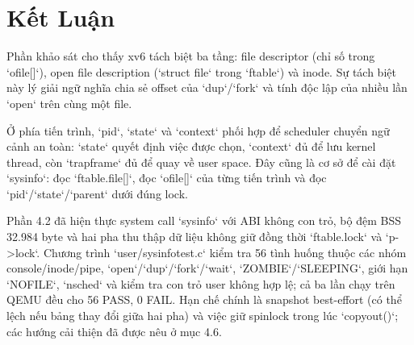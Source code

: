 \chapter{Kết Luận}

\newpage

Phần khảo sát cho thấy xv6 tách biệt ba tầng: file descriptor (chỉ số trong `ofile[]`), open file description (`struct file` trong `ftable`) và inode. Sự tách biệt này lý giải ngữ nghĩa chia sẻ offset của `dup`/`fork` và tính độc lập của nhiều lần `open` trên cùng một file.

Ở phía tiến trình, `pid`, `state` và `context` phối hợp để scheduler chuyển ngữ cảnh an toàn: `state` quyết định việc được chọn, `context` đủ để lưu kernel thread, còn `trapframe` đủ để quay về user space. Đây cũng là cơ sở để cài đặt `sysinfo`: đọc `ftable.file[]`, đọc `ofile[]` của từng tiến trình và đọc `pid`/`state`/`parent` dưới đúng lock.

Phần 4.2 đã hiện thực system call `sysinfo` với ABI không con trỏ, bộ đệm BSS 32.984 byte và hai pha thu thập dữ liệu không giữ đồng thời `ftable.lock` và `p->lock`. Chương trình `user/sysinfotest.c` kiểm tra 56 tình huống thuộc các nhóm console/inode/pipe, `open`/`dup`/`fork`/`wait`, `ZOMBIE`/`SLEEPING`, giới hạn `NOFILE`, `nsched` và kiểm tra con trỏ user không hợp lệ; cả ba lần chạy trên QEMU đều cho 56 PASS, 0 FAIL. Hạn chế chính là snapshot best-effort (có thể lệch nếu bảng thay đổi giữa hai pha) và việc giữ spinlock trong lúc `copyout()`; các hướng cải thiện đã được nêu ở mục 4.6.
